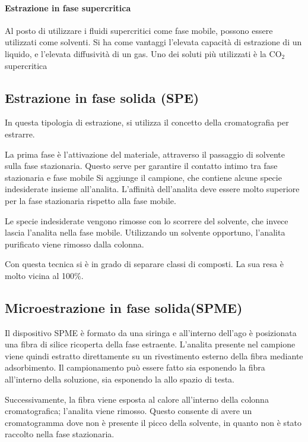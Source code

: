 \paragraph{Estrazione in fase supercritica}
Al posto di utilizzare i fluidi supercritici come fase mobile, possono essere utilizzati come solventi. Si ha come vantaggi l'elevata capacità di estrazione di un liquido,
e l'elevata diffusività di un gas.
Uno dei soluti più utilizzati è la CO$_2$ supercritica

\subsection{Estrazione in fase solida (SPE)}
In questa tipologia di estrazione, si utilizza il concetto della cromatografia per estrarre.

La prima fase è l'attivazione del materiale, attraverso il passaggio di solvente sulla fase stazionaria. Questo serve per garantire il contatto intimo tra fase stazionaria e fase mobile
Si aggiunge il campione, che contiene alcune specie indesiderate insieme all'analita. L'affinità dell'analita deve essere molto superiore per la fase stazionaria rispetto alla fase mobile.


Le specie indesiderate vengono rimosse con lo scorrere del solvente, che invece lascia l'analita nella fase mobile.
Utilizzando un solvente opportuno, l'analita purificato viene rimosso dalla colonna.

Con questa tecnica si è in grado di separare classi di composti. La sua resa è molto vicina al 100\%.

\subsection{Microestrazione in fase solida(SPME)}
Il dispositivo SPME è formato da una siringa e all'interno dell'ago è posizionata una fibra di silice ricoperta della fase estraente.
L'analita presente nel campione viene quindi estratto  direttamente su un rivestimento esterno della fibra mediante adsorbimento.
Il campionamento può essere fatto sia esponendo la fibra all'interno della soluzione, sia esponendo la allo spazio di testa.

Successivamente, la fibra viene esposta al calore all'interno della colonna cromatografica; l'analita viene rimosso.
Questo consente di avere un cromatogramma dove non è presente il picco della solvente, in quanto non è stato raccolto nella fase stazionaria.

